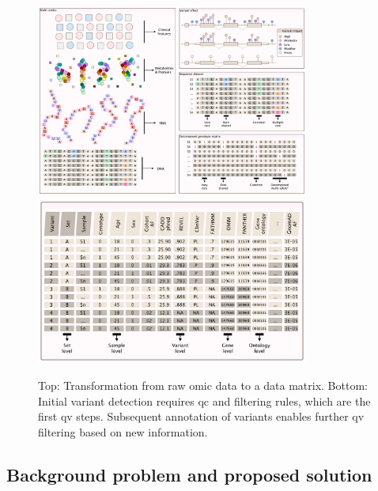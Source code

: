 \begin{figure}[h!]
    \centering
   \includegraphics[width=0.8\textwidth]{./images/candidate_variants_sequence_to_matrix_pink.pdf}
      \includegraphics[width=0.8\textwidth]{./images/candidate_variants_sequence_annotation_pink.pdf}
    \caption{
Top: Transformation from raw omic data to a data matrix. Bottom: Initial variant detection requires \ac{qc} and filtering rules, which are the first \ac{qv} steps. Subsequent annotation of variants enables further \ac{qv} filtering based on new information.    
    }
        \label{fig:candidate_variants_sequence_annotation}
\end{figure}

\subsection{Background problem and proposed solution}

